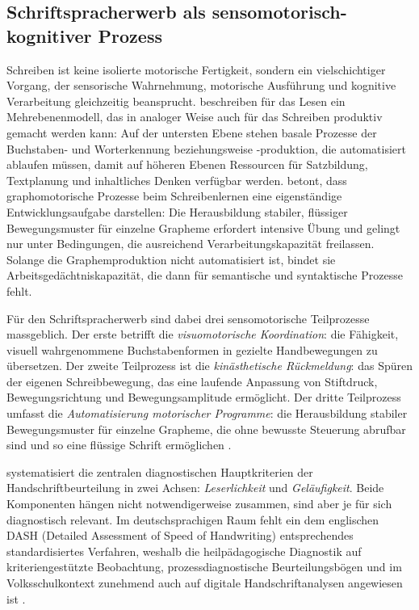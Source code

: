 \documentclass[ngerman, a4paper]{article}
\begin{document}
\subsection{Schriftspracherwerb als sensomotorisch-kognitiver Prozess}

Schreiben ist keine isolierte motorische Fertigkeit, sondern ein vielschichtiger Vorgang,
der sensorische Wahrnehmung, motorische Ausführung und kognitive Verarbeitung
gleichzeitig beansprucht. \textcite[Kap.\,1--4]{rosebrock2010grundlagen} beschreiben für das Lesen ein
Mehrebenenmodell, das in analoger Weise auch für das Schreiben produktiv gemacht werden
kann: Auf der untersten Ebene stehen basale Prozesse der Buchstaben- und Worterkennung
beziehungsweise -produktion, die automatisiert ablaufen müssen, damit auf höheren Ebenen
Ressourcen für Satzbildung, Textplanung und inhaltliches Denken verfügbar werden.
\textcite[S.\,2--4]{sturm2016graphomotorik} betont, dass graphomotorische Prozesse beim
Schreibenlernen eine eigenständige Entwicklungsaufgabe darstellen: Die Herausbildung
stabiler, flüssiger Bewegungsmuster für einzelne Grapheme erfordert intensive Übung
und gelingt nur unter Bedingungen, die ausreichend Verarbeitungskapazität freilassen.
Solange die Graphemproduktion nicht automatisiert ist,
bindet sie Arbeitsgedächtniskapazität, die dann für semantische und syntaktische Prozesse
fehlt.

Für den Schriftspracherwerb sind dabei drei sensomotorische Teilprozesse massgeblich.
Der erste betrifft die \textit{visuomotorische Koordination}: die Fähigkeit, visuell
wahrgenommene Buchstabenformen in gezielte Handbewegungen zu übersetzen. Der zweite
Teilprozess ist die \textit{kinästhetische Rückmeldung}: das Spüren der eigenen
Schreibbewegung, das eine laufende Anpassung von Stiftdruck, Bewegungsrichtung und
Bewegungsamplitude ermöglicht. Der dritte Teilprozess umfasst die
\textit{Automatisierung motorischer Programme}: die Herausbildung stabiler
Bewegungsmuster für einzelne Grapheme, die ohne bewusste Steuerung abrufbar sind und
so eine flüssige Schrift ermöglichen
\parencite[S.\,125--138]{nottbusch2017graphomotorik}.

\textcite[S.\,3,\,11]{hurschler2020handschriftbeurteilung} systematisiert die zentralen
diagnostischen Hauptkriterien der Handschriftbeurteilung in zwei Achsen:
\textit{Leserlichkeit} und \textit{Geläufigkeit}. Beide Komponenten hängen
nicht notwendigerweise zusammen, sind aber je für sich diagnostisch relevant.
Im deutschsprachigen Raum fehlt ein dem englischen DASH (Detailed Assessment
of Speed of Handwriting) entsprechendes standardisiertes Verfahren, weshalb
die heilpädagogische Diagnostik auf kriteriengestützte Beobachtung,
prozessdiagnostische Beurteilungsbögen und im Volksschulkontext zunehmend
auch auf digitale Handschriftanalysen angewiesen ist
\parencite[S.\,11]{hurschler2020handschriftbeurteilung}.
\end{document}

